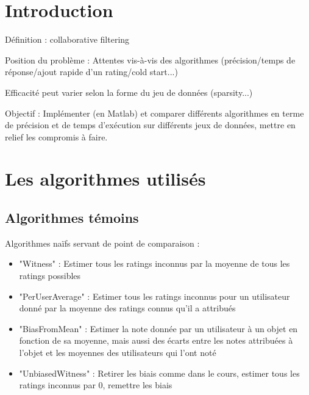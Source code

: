 \newcommand{\ANNOT}[1]{
  ~\linebreak
  \centerline{
    \large\fcolorbox{black}{bleuclair}{
      \begin{minipage}[h]{.8\linewidth}
      #1
      \end{minipage}
    }
  }
}

\newcommand\tikzmark[1]{%
  \tikz[overlay,remember picture,baseline] 
  \node[anchor=base](#1){};}

\newcommand\MyLine[3][]{%
  \begin{tikzpicture}[overlay,remember picture]
    \draw[#1] (#2.north west) -- (#3.south east);
  \end{tikzpicture}}


\graphicspath{{.}}
\newcommand{\e}[1]{$\times 10^{#1}$}


\section*{Introduction}

Définition : collaborative filtering

Position du problème : 
Attentes vis-à-vis des algorithmes (précision/temps de réponse/ajout rapide d'un rating/cold start...)

Efficacité peut varier selon la forme du jeu de données (sparsity...)

Objectif : Implémenter (en Matlab) et comparer différents algorithmes en terme de précision et de temps d'exécution sur différents jeux de données, mettre en relief les compromis à faire.

\section{Les algorithmes utilisés}
	\subsection{Algorithmes témoins}
		Algorithmes naïfs servant de point de comparaison : 
			\begin{itemize}
				\item{"Witness" : Estimer tous les ratings inconnus par la moyenne de tous les ratings possibles}
				\item{"PerUserAverage" : Estimer tous les ratings inconnus pour un utilisateur donné par la moyenne des ratings connus qu'il a attribués}
				\item{"BiasFromMean" : Estimer la note donnée par un utilisateur à un objet en fonction de sa moyenne, mais aussi des écarts entre les notes attribuées à l'objet et les moyennes des utilisateurs qui l'ont noté}
				\item{"UnbiasedWitness" : Retirer les biais comme dans le cours, estimer tous les ratings inconnus par $0$, remettre les biais}
			\end{itemize}

